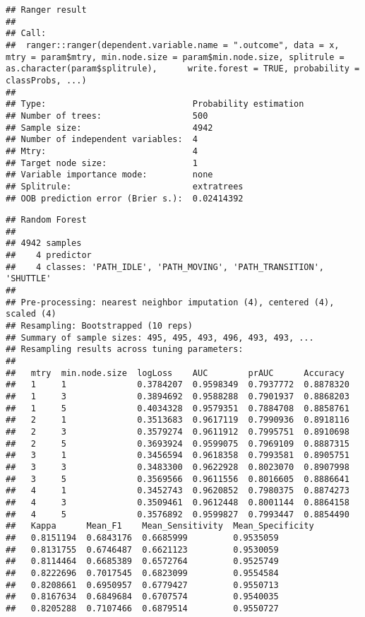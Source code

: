 \documentclass[]{article}
\begin{document}
\begin{verbatim}
## Ranger result
## 
## Call:
##  ranger::ranger(dependent.variable.name = ".outcome", data = x,      mtry = param$mtry, min.node.size = param$min.node.size, splitrule = as.character(param$splitrule),      write.forest = TRUE, probability = classProbs, ...) 
## 
## Type:                             Probability estimation 
## Number of trees:                  500 
## Sample size:                      4942 
## Number of independent variables:  4 
## Mtry:                             4 
## Target node size:                 1 
## Variable importance mode:         none 
## Splitrule:                        extratrees 
## OOB prediction error (Brier s.):  0.02414392
\end{verbatim}

\begin{verbatim}
## Random Forest 
## 
## 4942 samples
##    4 predictor
##    4 classes: 'PATH_IDLE', 'PATH_MOVING', 'PATH_TRANSITION', 'SHUTTLE' 
## 
## Pre-processing: nearest neighbor imputation (4), centered (4), scaled (4) 
## Resampling: Bootstrapped (10 reps) 
## Summary of sample sizes: 495, 495, 493, 496, 493, 493, ... 
## Resampling results across tuning parameters:
## 
##   mtry  min.node.size  logLoss    AUC        prAUC      Accuracy 
##   1     1              0.3784207  0.9598349  0.7937772  0.8878320
##   1     3              0.3894692  0.9588288  0.7901937  0.8868203
##   1     5              0.4034328  0.9579351  0.7884708  0.8858761
##   2     1              0.3513683  0.9617119  0.7990936  0.8918116
##   2     3              0.3579274  0.9611912  0.7995751  0.8910698
##   2     5              0.3693924  0.9599075  0.7969109  0.8887315
##   3     1              0.3456594  0.9618358  0.7993581  0.8905751
##   3     3              0.3483300  0.9622928  0.8023070  0.8907998
##   3     5              0.3569566  0.9611556  0.8016605  0.8886641
##   4     1              0.3452743  0.9620852  0.7980375  0.8874273
##   4     3              0.3509461  0.9612448  0.8001144  0.8864158
##   4     5              0.3576892  0.9599827  0.7993447  0.8854490
##   Kappa      Mean_F1    Mean_Sensitivity  Mean_Specificity
##   0.8151194  0.6843176  0.6685999         0.9535059       
##   0.8131755  0.6746487  0.6621123         0.9530059       
##   0.8114464  0.6685389  0.6572764         0.9525749       
##   0.8222696  0.7017545  0.6823099         0.9554584       
##   0.8208661  0.6950957  0.6779427         0.9550713       
##   0.8167634  0.6849684  0.6707574         0.9540035       
##   0.8205288  0.7107466  0.6879514         0.9550727       

\end{verbatim}
\end{document}
